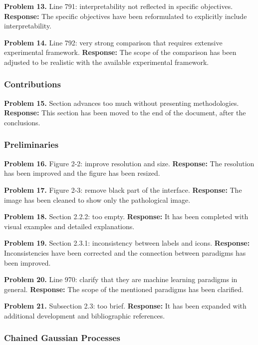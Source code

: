 \documentclass[12pt,a4paper]{article}
\begin{document}
\textbf{Problem 13.} Line 791: interpretability not reflected in
specific objectives.
\textbf{Response:} The specific objectives have been reformulated to
explicitly include interpretability.

\textbf{Problem 14.} Line 792: very strong comparison that requires
extensive experimental framework.
\textbf{Response:} The scope of the comparison has been adjusted to
be realistic with the available experimental framework.

\subsubsection*{Contributions}

\textbf{Problem 15.} Section advances too much without presenting methodologies.
\textbf{Response:} This section has been moved to the end of the document,
after the conclusions.

\subsubsection*{Preliminaries}

\textbf{Problem 16.} Figure 2-2: improve resolution and size.
\textbf{Response:} The resolution has been improved and the figure
has been resized.

\textbf{Problem 17.} Figure 2-3: remove black part of the interface.
\textbf{Response:} The image has been cleaned to show only the
pathological image.

\textbf{Problem 18.} Section 2.2.2: too empty.
\textbf{Response:} It has been completed with visual examples and
detailed explanations.

\textbf{Problem 19.} Section 2.3.1: inconsistency between labels and icons.
\textbf{Response:} Inconsistencies have been corrected and
the connection between paradigms has been improved.

\textbf{Problem 20.} Line 970: clarify that they are machine learning
paradigms in general.
\textbf{Response:} The scope of the mentioned paradigms has been clarified.

\textbf{Problem 21.} Subsection 2.3: too brief.
\textbf{Response:} It has been expanded with additional development and
bibliographic references.

\subsubsection*{Chained Gaussian Processes}
\end{document}

